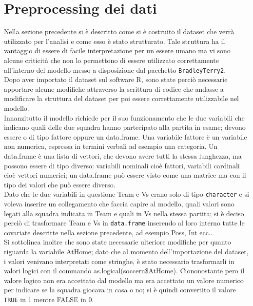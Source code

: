 \section{Preprocessing dei dati}
Nella sezione precedente si è descritto come si è costruito il dataset che verrà utilizzato per l'analisi e come esso è stato strutturato. Tale struttura ha il vantaggio di essere di facile interpretazione per un essere umano ma vi sono alcune criticità che non lo permettono di essere utilizzato correttamente all'interno del modello messo a disposizione dal pacchetto \texttt{BradleyTerry2}.\\ Dopo aver importato il dataset sul software R, sono state perciò necessarie apportare alcune modifiche attraverso la scrittura di codice che andasse a modificare la struttura del dataset per poi essere correttamente utilizzabile nel modello. \\

Innanzitutto il modello richiede per il suo funzionamento che le due variabili che indicano quali delle due squadra hanno partecipato alla partita in esame; devono essere o di tipo fattore oppure un \textsf{data.frame}. Una variabile fattore è un variabile non numerica, espressa in termini verbali ad esempio una categoria. Un \textsf{data.frame} è una lista di vettori, che devono avere tutti la stessa lunghezza, ma possono essere di tipo diverso: variabili nominali cioè fattori, variabili cardinali cioè vettori numerici; un \textsf{data.frame} può essere visto come una matrice ma con il tipo dei valori che può essere diverso.\\ Dato che le due variabili in questione \textsf{Team} e \textsf{Vs} erano solo di tipo \texttt{character} e si voleva inserire un collegamento che faccia capire al modello, quali valori sono legati alla squadra indicata in \textsf{Team} e quali in \textsf{Vs} nella stessa partita; si è deciso perciò di trasformare \textsf{Team} e \textsf{Vs} in \texttt{data.frame} inserendo al loro interno tutte le covariate descritte nella sezione precedente, ad esempio \textsf{Poss}, \textsf{Int} ecc..\\

Si sottolinea inoltre che sono state necessarie ulteriore modifiche per quanto riguarda la variabile \textsf{AtHome}; dato che al momento dell'importazione del dataset, i valori venivano interpretati come stringhe, è stato necessario trasformarli in valori logici con il commando \textsf{as.logical(soccern\$AtHome)}. Ciononostante pero il valore logico non era accettato dal modello ma era accettato un valore numerico per indicare se la squadra giocava in casa o no; si è quindi convertito il valore \texttt{TRUE} in 1 mentre FALSE in 0. 

